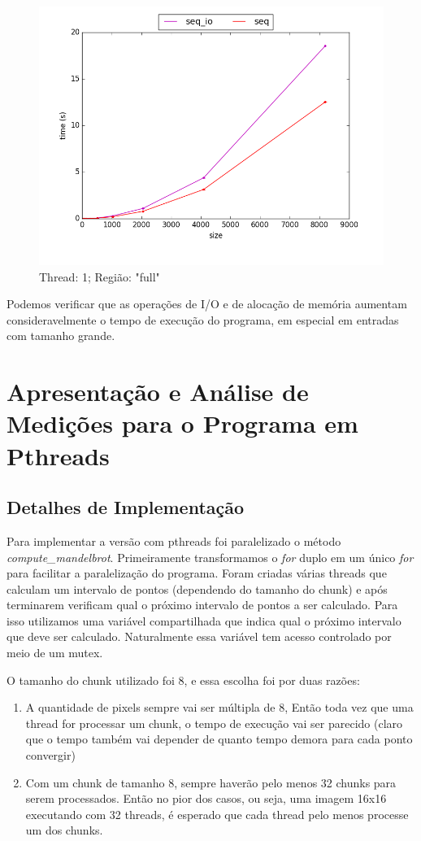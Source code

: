 \documentclass[final,12pt,a4paper]{elsarticle}
\begin{document}
\clearpage
\begin{figure}[htpb]
    \centering
    \includegraphics[width=.9\textwidth]{image3}
    \caption{Thread: 1; Região: "full"}
    \label{fig:image3}
\end{figure}

Podemos verificar que as operações de I/O e de alocação de memória aumentam consideravelmente o tempo de execução do programa, em especial em entradas com tamanho grande.

\section{Apresentação e Análise de Medições para o Programa em Pthreads}

\subsection{Detalhes de Implementação}

Para implementar a versão com pthreads foi paralelizado o método \textit{compute\_mandelbrot}. Primeiramente transformamos o \textit{for} duplo em um único \textit{for} para facilitar a paralelização do programa. Foram criadas várias threads que calculam um intervalo de pontos (dependendo do tamanho do chunk) e após terminarem verificam qual o próximo intervalo de pontos a ser calculado. Para isso utilizamos uma variável compartilhada que indica qual o próximo intervalo que deve ser calculado. Naturalmente essa variável tem acesso controlado por meio de um mutex.

O tamanho do chunk utilizado foi 8, e essa escolha foi por duas razões: 
\begin{enumerate}
\item 
A quantidade de pixels sempre vai ser múltipla de 8, Então toda vez que uma thread for processar um chunk, o tempo de execução vai ser parecido (claro que o tempo também vai depender de quanto tempo demora para cada ponto convergir)
\item
Com um chunk de tamanho 8, sempre haverão pelo menos 32 chunks para serem processados. Então no pior dos casos, ou seja, uma imagem 16x16 executando com 32 threads, é esperado que cada thread pelo menos processe um dos chunks.
\end{enumerate}
\end{document}
